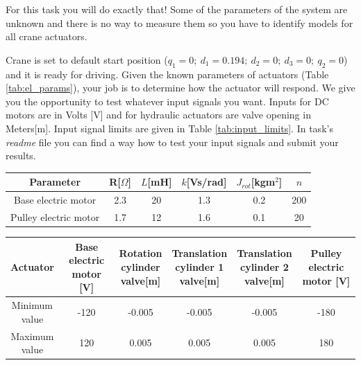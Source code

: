 \documentclass[openany]{book}
\begin{document}
	For this task you will do exactly that! Some of the parameters of the 
	system are unknown and there is no way to measure them so you have to 
	identify models for all crane actuators.
	
	Crane is set to default start position ($q_1 = 0; \ d_1 = 0.194; \  d_2 = 
	0; \  d_3 = 0; \  q_2 = 0$) and it is ready for driving. Given the known 
	parameters of actuators (Table \ref{tab:el_params}), your job is to 
	determine how the actuator will respond. We give you the opportunity to 
	test whatever input signals you want.
	Inputs for DC motors are in Volts [V] and for hydraulic actuators are valve 
	opening in Meters[m]. Input signal limits are given in Table 
	\ref{tab:input_limits}.  In task's \textit{readme} file you can find a way 
	how to test your input signals and submit your results.
	
	\begin{center}
		\label{tab:el_params}
		\begin{tabular}{|| c || c c c c c||}
			\hline
			Parameter & R[$\Omega$] & $L$[mH] & $k$[Vs/rad] & 
			$J_{rot}$[kgm$^2$] & 
			$n$\\
			\hline\hline
			Base electric motor & 2.3 & 20 & 1.3 & 0.2 & 200\\ 
			\hline
			Pulley electric motor & 1.7 & 12 & 1.6 & 0.1 & 20\\
			\hline
		\end{tabular}
	\end{center}
	
	\begin{center}
		
		\label{tab:input_limits}
		\begin{tabular}{|| c || c c c c c ||}
			\hline
			Actuator & \makecell{Base electric \\ motor [V]} & 
			\makecell{Rotation \\ cylinder \\ valve[m]} & \makecell{Translation 
			\\ cylinder 1 \\ valve[m]} & \makecell{Translation \\ cylinder 2 \\ 
			valve[m]} &  \makecell{Pulley electric \\ motor [V]}\\
			\hline\hline
			\makecell{Minimum \\ value} & -120 & -0.005 & -0.005 & -0.005 & 
			-180 \\ 
			\hline
			\makecell{Maximum\\ value} & 120 & 0.005 & 0.005 & 0.005 & 180 \\ 
			\hline
		\end{tabular}
	\end{center}
	
\end{document}
